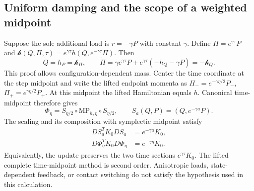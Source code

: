 \subsection{Uniform damping and the scope of a weighted midpoint}
Suppose the sole additional load is $r=-\gamma P$ with constant $\gamma$. Define $\Pi=e^{\gamma\tau}P$ and $\mathcal h(Q,\Pi,\tau)=e^{\gamma\tau}h(Q,e^{-\gamma\tau}\Pi)$. Then
\begin{equation}
 \dot Q=h_P=\mathcal h_\Pi,\qquad
 \dot\Pi=\gamma e^{\gamma\tau}P+e^{\gamma\tau}(-h_Q-\gamma P)
         =-\mathcal h_Q.
 \label{eq:sup-weighted-lift}
\end{equation}
This proof allows configuration-dependent mass. Center the time coordinate at the step midpoint and write the lifted endpoint momenta as $\Pi_-=e^{-\gamma\eta/2}P_-$, $\Pi_+=e^{\gamma\eta/2}P_+$. At this midpoint the lifted Hamiltonian equals $h$. Canonical time-midpoint therefore gives
\begin{equation}
 \Phi_\eta=S_{\eta/2}\circ\mathrm{MP}_{h,\eta}\circ S_{\eta/2},
 \qquad S_a(Q,P)=(Q,e^{-\gamma a}P).
 \label{eq:sup-weighted-method}
\end{equation}
The scaling and its composition with symplectic midpoint satisfy
\begin{equation}
 \begin{aligned}
 DS_a^TK_0DS_a&=e^{-\gamma a}K_0,\\
 D\Phi_\eta^TK_0D\Phi_\eta&=e^{-\gamma\eta}K_0.
 \end{aligned}
 \label{eq:sup-weighted-pullback}
\end{equation}
Equivalently, the update preserves the two time sections $e^{\gamma\tau}K_0$. The lifted complete time-midpoint method is second order. Anisotropic loads, state-dependent feedback, or contact switching do not satisfy the hypothesis used in this calculation.

